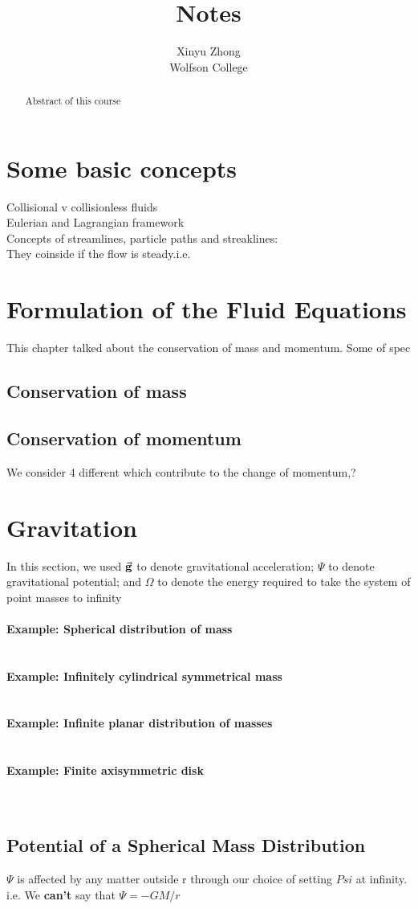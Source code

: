 \documentclass[10pt,a4paper]{article}
\author{Xinyu Zhong\\Wolfson College}
\title{Notes}
\newcommand{\example}[2]{\textbf{Example: #1}\\\textcolor{blue}{#2}\\ \\}
\begin{document}
\begin{titlepage}
    \maketitle
\end{titlepage}

\tableofcontents

\newpage

\begin{abstract}
\noindent
Abstract of this course
\end{abstract}
\section{Some basic concepts}
Collisional v collisionless fluids\\
Eulerian and Lagrangian framework\\
Concepts of streamlines, particle paths and streaklines:\\
They coinside if the flow is steady.i.e. \\
\section{Formulation of the Fluid Equations}
This chapter talked about the conservation of mass and momentum. Some of spec
\subsection{Conservation of mass}
\subsection{Conservation of momentum}
We consider 4 different which contribute to the change of momentum,?
\section{Gravitation}
In this section, 
we used $\va{g}$ to denote gravitational acceleration; 
$\Psi$ to denote gravitational potential;
and $\Omega$ to denote the energy required to take the system of point masses to infinity\\
\\
\example{Spherical distribution of mass}{}
\example{Infinitely cylindrical symmetrical mass}{}
\example{Infinite planar distribution of masses}{}
\example{Finite axisymmetric disk}{}
\subsection{Potential of a Spherical Mass Distribution}
$\Psi$ is affected by any matter outside r through our choice of setting $Psi$ at infinity. 
i.e. We \textbf{can't} say that $\Psi = -GM/r$
\end{document}
